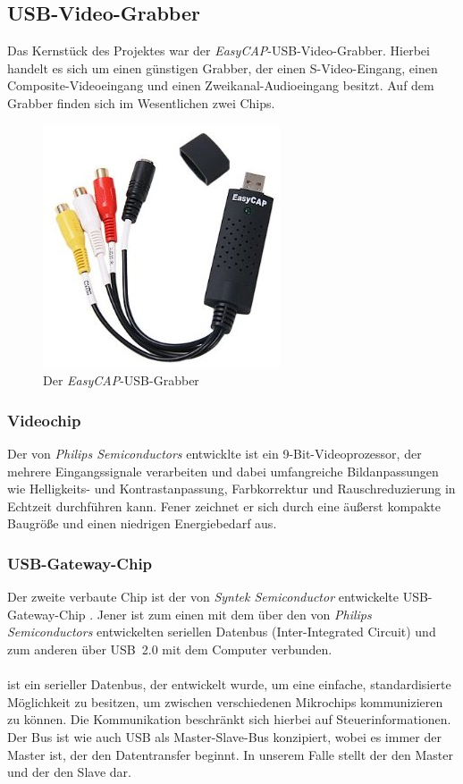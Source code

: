 \subsection{USB-Video-Grabber}
Das Kernstück des Projektes war der \emph{EasyCAP}-USB-Video-Grabber.
Hierbei handelt es sich um einen günstigen Grabber, der einen S-Video-Eingang, einen Composite-Videoeingang und einen Zweikanal-Audioeingang besitzt.
Auf dem Grabber finden sich im Wesentlichen zwei Chips.
\begin{figure}[h]
 \centering
 \includegraphics[width=.5\textwidth]{grabber}
 \caption{Der \emph{EasyCAP}-USB-Grabber}
\end{figure}

\subsubsection{Videochip \saa}
Der von \emph{Philips Semiconductors} entwicklte \saa{} ist ein 9-Bit-Videoprozessor, der mehrere Eingangssignale verarbeiten und dabei umfangreiche Bildanpassungen wie Helligkeits- und Kontrastanpassung, Farbkorrektur und Rauschreduzierung in Echtzeit durchführen kann.
Fener zeichnet er sich durch eine äußerst kompakte Baugröße und einen niedrigen Energiebedarf aus.

\subsubsection{USB-Gateway-Chip \stk}
Der zweite verbaute Chip ist der von \emph{Syntek Semiconductor} entwickelte USB-Gateway-Chip \stk.
Jener ist zum einen mit dem \saa{} über den von \emph{Philips Semiconductors} entwickelten seriellen Datenbus \iic{} (Inter-Integrated Circuit) und zum anderen über USB~2.0 mit dem Computer verbunden.

\paragraph{\iic}
\iic{} ist ein serieller Datenbus, der entwickelt wurde, um eine einfache, standardisierte Möglichkeit zu besitzen, um zwischen verschiedenen Mikrochips kommunizieren zu können.
Die Kommunikation beschränkt sich hierbei auf Steuerinformationen.
Der Bus ist wie auch USB als Master-Slave-Bus konzipiert, wobei es immer der Master ist, der den Datentransfer beginnt.
In unserem Falle stellt der \stk{} den Master und der \saa{} den Slave dar.

